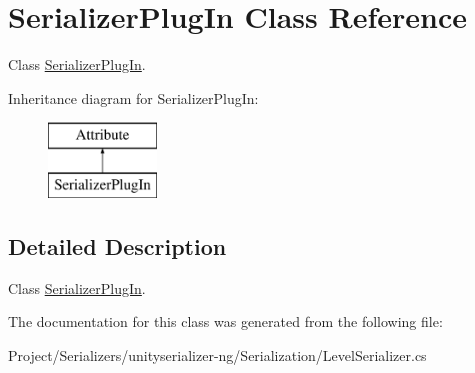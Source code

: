 \hypertarget{class_serializer_plug_in}{}\section{Serializer\+Plug\+In Class Reference}
\label{class_serializer_plug_in}


Class \hyperlink{class_serializer_plug_in}{Serializer\+Plug\+In}.  


Inheritance diagram for Serializer\+Plug\+In\+:\begin{figure}[H]
\begin{center}
\leavevmode
\includegraphics[height=2.000000cm]{class_serializer_plug_in}
\end{center}
\end{figure}


\subsection{Detailed Description}
Class \hyperlink{class_serializer_plug_in}{Serializer\+Plug\+In}. 



The documentation for this class was generated from the following file\+:\begin{DoxyCompactItemize}
\item 
Project/\+Serializers/unityserializer-\/ng/\+Serialization/Level\+Serializer.\+cs\end{DoxyCompactItemize}
